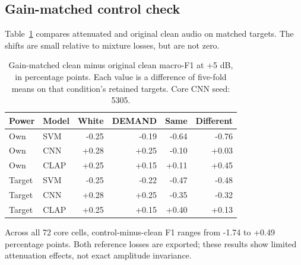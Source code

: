 \subsection{Gain-matched control check}
Table~\ref{tab:gain} compares attenuated and original clean audio on matched
targets. The shifts are small relative to mixture losses, but are not zero.
\begin{table}[htbp]\centering\small
\caption{Gain-matched clean minus original clean macro-F1 at +5 dB, in percentage points. Each value is a difference of five-fold means on that condition's retained targets. Core CNN seed: 5305.}
\label{tab:gain}\begin{tabular}{llrrrr}\toprule Power & Model & White & DEMAND & Same & Different\\\midrule
Own & SVM & -0.25 & -0.19 & -0.64 & -0.76 \\
Own & CNN & +0.28 & +0.25 & -0.10 & +0.03 \\
Own & CLAP & +0.25 & +0.15 & +0.11 & +0.45 \\
\midrule
Target & SVM & -0.25 & -0.22 & -0.47 & -0.48 \\
Target & CNN & +0.28 & +0.25 & -0.35 & -0.32 \\
Target & CLAP & +0.25 & +0.15 & +0.40 & +0.13 \\
\bottomrule\end{tabular}\end{table}
Across all 72 core cells, control-minus-clean F1 ranges from -1.74 to +0.49 percentage points. Both reference losses are exported; these results show limited attenuation effects, not exact amplitude invariance.

